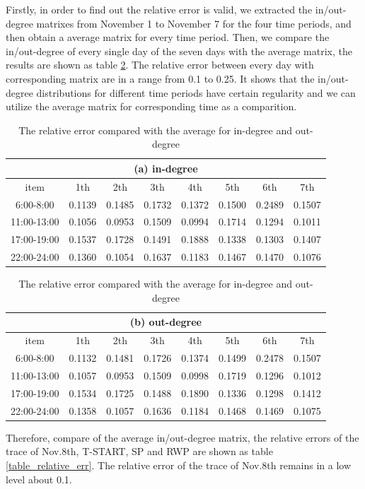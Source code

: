 Firstly, in order to find out the relative error is valid, we extracted the in/out-degree matrixes from November 1 to November 7 for the four time periods, and then obtain a average matrix for every time period. Then, we compare the in/out-degree of every single day of the seven days with the average matrix, the results are shown as table \ref{table_relative_err_avg}. The relative error between every day with corresponding matrix are in a range from 0.1 to 0.25. It shows that the in/out-degree distributions for different time periods have certain regularity and we can utilize the average matrix for corresponding time as a comparition. 
\begin{table}[!t]
\centering
\caption{The relative error compared with the average for in-degree and out-degree}\label{table_relative_err_avg}
\begin{tabular}[c]{c|c|c|c|c|c|c|c}
\multicolumn{8}{c}{(a) in-degree}\\
\hline
item& 1th&2th&3th&4th&5th&6th&7th\\
\hline
6:00-8:00&
0.1139& 
0.1485&
0.1732&
0.1372&
0.1500&
0.2489&
0.1507\\
11:00-13:00&
0.1056&
0.0953&
0.1509&
0.0994&
0.1714&
0.1294&
0.1011\\
17:00-19:00&
0.1537&
0.1728&
0.1491&
0.1888&
0.1338&
0.1303&
0.1407\\
22:00-24:00&
0.1360&
0.1054&
0.1637&
0.1183&
0.1467&
0.1470&
0.1076\\
\hline
\end{tabular}
\begin{tabular}[c]{c|c|c|c|c|c|c|c}
\multicolumn{8}{c}{(b) out-degree}\\
\hline
item& 1th&2th&3th&4th&5th&6th&7th\\
\hline
6:00-8:00&
0.1132&
0.1481&
0.1726&
0.1374&
0.1499&
0.2478&
0.1507\\
11:00-13:00&
0.1057&
0.0953&
0.1509&
0.0998&
0.1719&
0.1296&
0.1012\\
17:00-19:00&
0.1534&
0.1725&
0.1488&
0.1890&
0.1336&
0.1298&
0.1412\\
22:00-24:00&
0.1358&
0.1057&
0.1636&
0.1184&
0.1468&
0.1469&
0.1075\\
\hline
\end{tabular}
\end{table}
Therefore, compare of the average in/out-degree matrix, the relative errors of the trace of Nov.8th, T-START, SP and RWP are shown as table \ref{table_relative_err}.
The relative error of the trace of Nov.8th remains in a low level about 0.1.
